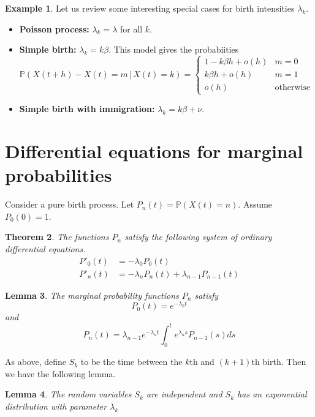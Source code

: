 \documentclass[10pt, oneside, reqno]{amsart}
\theoremstyle{plain}%
\newtheorem{thm}{Theorem}[section]
\newtheorem{lem}[thm]{Lemma}
\theoremstyle{definition}
\newtheorem{exmp}[thm]{Example}
\theoremstyle{remark}
\newcommand{\prob}[1]{\mathbb{P}(#1)}
\newcommand{\given}{ \, | \,}
\begin{document}
\begin{exmp}
	Let us review some interesting special cases for birth intensities $\lambda_k$.
	
	\begin{itemize}
		\item \textbf{Poisson process:} $\lambda_k = \lambda$ for all $k$.
		\item \textbf{Simple birth:} $\lambda_k = k \beta$.  This model gives the probabiities \[
			\prob{X(t+h) - X(t) = m \given X(t) =k} = \begin{cases}
				1 - k\beta h + o(h) & m = 0 \\
				k\beta h + o(h) &m=1\\
				o(h) &\text{otherwise}
			\end{cases}
		\]
		\item \textbf{Simple birth with immigration:} $\lambda_k = k \beta + \nu$.  
	\end{itemize}
\end{exmp}


\section{Differential equations for marginal probabilities} %
\label{sub:differential_equations_for_marginal_probabilities}

Consider a pure birth process.  Let $P_n(t) = \prob{X(t) = n}$.  Assume $P_0(0) = 1$.
\begin{thm}
	The functions $P_n$ satisfy the following system of ordinary differential equations.
	\begin{align*}
		P'_0(t) &= -\lambda_0 P_0(t) \\
		P'_n(t) &= -\lambda_n P_n(t) + \lambda_{n-1} P_{n-1}(t)
	\end{align*}
\end{thm}

\begin{lem}
	The marginal probability functions $P_n$ satisfy \[
		P_0(t) = e^{-\lambda_0 t}
	\] and \[
		P_n(t) = \lambda_{n-1} e^{-\lambda_n t} \int_0^t e^{\lambda_n s} P_{n-1}(s) ds
	\]
\end{lem}

As above, define $S_k$ to be the time between the $k$th and $(k+1)$th birth.  Then we have the following lemma.

\begin{lem}
	The random variables $S_k$ are independent and $S_k$ has an exponential distribution with parameter $\lambda_k$
\end{lem}
\end{document}
